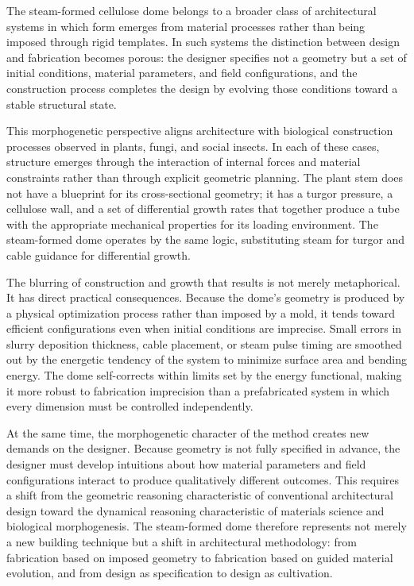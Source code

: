 \documentclass[12pt,a4paper]{article}
\begin{document}
The steam-formed cellulose dome belongs to a broader class of
architectural systems in which form emerges from material processes
rather than being imposed through rigid templates. In such systems the
distinction between design and fabrication becomes porous: the designer
specifies not a geometry but a set of initial conditions, material
parameters, and field configurations, and the construction process
completes the design by evolving those conditions toward a stable
structural state.

This morphogenetic perspective aligns architecture with biological
construction processes observed in plants, fungi, and social insects.
In each of these cases, structure emerges through the interaction of
internal forces and material constraints rather than through explicit
geometric planning. The plant stem does not have a blueprint for its
cross-sectional geometry; it has a turgor pressure, a cellulose wall,
and a set of differential growth rates that together produce a tube
with the appropriate mechanical properties for its loading environment.
The steam-formed dome operates by the same logic, substituting steam
for turgor and cable guidance for differential growth.

The blurring of construction and growth that results is not merely
metaphorical. It has direct practical consequences. Because the dome's
geometry is produced by a physical optimization process rather than
imposed by a mold, it tends toward efficient configurations even when
initial conditions are imprecise. Small errors in slurry deposition
thickness, cable placement, or steam pulse timing are smoothed out by
the energetic tendency of the system to minimize surface area and
bending energy. The dome self-corrects within limits set by the energy
functional, making it more robust to fabrication imprecision than a
prefabricated system in which every dimension must be controlled
independently.

At the same time, the morphogenetic character of the method creates
new demands on the designer. Because geometry is not fully specified in
advance, the designer must develop intuitions about how material
parameters and field configurations interact to produce qualitatively
different outcomes. This requires a shift from the geometric reasoning
characteristic of conventional architectural design toward the dynamical
reasoning characteristic of materials science and biological
morphogenesis. The steam-formed dome therefore represents not merely a
new building technique but a shift in architectural methodology: from
fabrication based on imposed geometry to fabrication based on guided
material evolution, and from design as specification to design as
cultivation.
\end{document}
